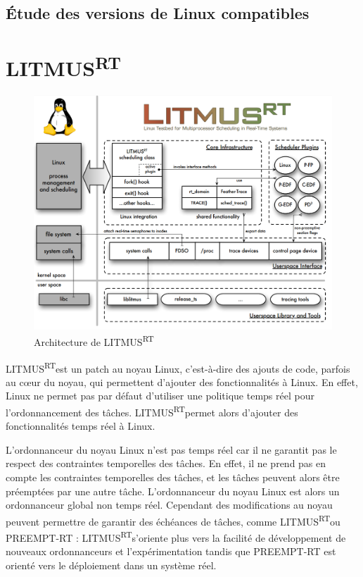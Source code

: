 \documentclass[11pt]{article}
\newcommand{\litmus}{LITMUS\textsuperscript{RT}}
\begin{document}
    \subsection{Étude des versions de Linux compatibles}
    

    \newpage
    \section{\litmus}
    \label{section:litmus}
    
\begin{figure}[H]
    \centering
    \includegraphics[width=0.5\paperwidth]{Images/litmusrtarchitecture.png}
    \caption{Architecture de \litmus}
    \label{fig:litmusrtarchitecture}
\end{figure}

    \litmus est un patch au noyau Linux, c'est-à-dire des ajouts de code, parfois au cœur du noyau, qui permettent d'ajouter des fonctionnalités à Linux. En effet, Linux ne permet pas par défaut d'utiliser une politique temps réel pour l'ordonnancement des tâches. \litmus permet alors d'ajouter des fonctionnalités temps réel à Linux.
    
    L'ordonnanceur du noyau Linux n'est pas temps réel car il ne garantit pas le respect des contraintes temporelles des tâches. En effet, il ne prend pas en compte les contraintes temporelles des tâches, et les tâches peuvent alors être préemptées par une autre tâche. L'ordonnanceur du noyau Linux est alors un ordonnanceur global non temps réel. Cependant des modifications au noyau peuvent permettre de garantir des échéances de tâches, comme \litmus ou PREEMPT-RT : \litmus s'oriente plus vers la facilité de développement de nouveaux ordonnanceurs et l'expérimentation tandis que PREEMPT-RT est orienté vers le déploiement dans un système réel.
    
\end{document}
